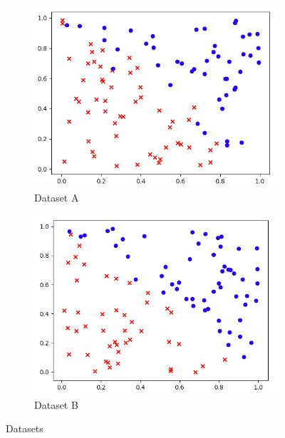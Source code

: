 
\begin{answer}

\begin{figure}[htbp]
\begin{subfigure}[b]{0.5\linewidth}
    \centering
    \includegraphics[width=\linewidth]{pics/F1b-b.png}
    \caption{Dataset A}\label{fig:dataset-a}
\end{subfigure}
\begin{subfigure}[b]{0.5\linewidth}
    \centering
    \includegraphics[width=\linewidth]{pics/F1b-a.png}
    \caption{Dataset B}\label{fig:dataset-b}
\end{subfigure}
\caption{Datasets}
\label{fig:datasets}
\end{figure}


\end{answer}
